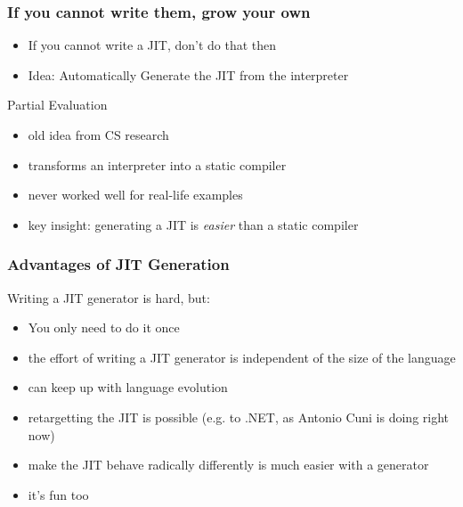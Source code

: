 \documentclass[utf8x]{beamer}
\begin{document}
\begin{frame}
  \frametitle{If you cannot write them, grow your own}
  \begin{itemize}
  \item If you cannot write a JIT, don't do that then
  \pause
  \item Idea: Automatically Generate the JIT from the interpreter
  \pause
  \end{itemize}
  \begin{block}{
    Partial Evaluation}
    \begin{itemize}
    \item old idea from CS research
    \item transforms an interpreter into a static compiler
    \item never worked well for real-life examples
    \item key insight: generating a JIT is \emph{easier} than a static compiler
    \end{itemize}
  \end{block}
 
\end{frame}

\begin{frame}
  \frametitle{Advantages of JIT Generation}
  Writing a JIT generator is hard, but:
  \begin{itemize}
  \item You only need to do it once
  \item the effort of writing a JIT generator is independent of the size of the language
  \item can keep up with language evolution
  \item retargetting the JIT is possible (e.g. to .NET, as Antonio Cuni is doing right now)
  \item make the JIT behave radically differently is much easier with a generator
  \item it's fun too
  \end{itemize}
\end{frame}
\end{document}
